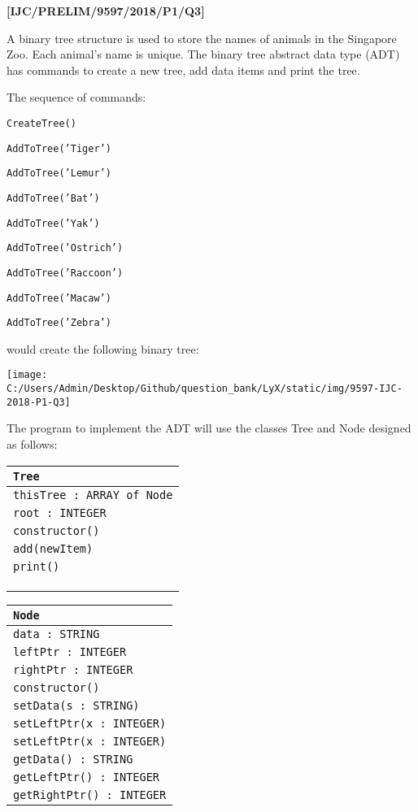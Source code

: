 \item \textbf{{[}IJC/PRELIM/9597/2018/P1/Q3{]} }

A binary tree structure is used to store the names of animals in the
Singapore Zoo. Each animal\textquoteright s name is unique. The binary
tree abstract data type (ADT) has commands to create a new tree, add
data items and print the tree.

The sequence of commands:

\noindent %
\noindent\begin{minipage}[t]{1\columnwidth}%
\texttt{CreateTree() }

\texttt{AddToTree('Tiger') }

\texttt{AddToTree('Lemur') }

\texttt{AddToTree('Bat') }

\texttt{AddToTree('Yak') }

\texttt{AddToTree('Ostrich') }

\texttt{AddToTree('Raccoon') }

\texttt{AddToTree('Macaw')}

\texttt{AddToTree('Zebra')}%
\end{minipage}

would create the following binary tree:
\begin{center}
\texttt{[image: C:/Users/Admin/Desktop/Github/question\_bank/LyX/static/img/9597-IJC-2018-P1-Q3]}
\par\end{center}

The program to implement the ADT will use the classes Tree and Node
designed as follows:
\begin{center}
\begin{tabular}{|l|}
\hline 
\texttt{\hspace{0.25\columnwidth}Tree}\tabularnewline
\hline 
\texttt{thisTree : ARRAY of Node}\tabularnewline
\texttt{root : INTEGER}\tabularnewline
\hline 
\texttt{constructor()}\tabularnewline
\texttt{add(newItem)}\tabularnewline
\texttt{print()}\tabularnewline
\tabularnewline
\tabularnewline
\tabularnewline
\hline 
\end{tabular}%
\begin{tabular}{|l|}
\hline 
\texttt{\hspace{0.25\columnwidth}Node}\tabularnewline
\hline 
\texttt{data : STRING}\tabularnewline
\texttt{leftPtr : INTEGER}\tabularnewline
\texttt{rightPtr : INTEGER }\tabularnewline
\hline 
\texttt{constructor()}\tabularnewline
\texttt{setData(s : STRING)}\tabularnewline
\texttt{setLeftPtr(x : INTEGER)}\tabularnewline
\texttt{setLeftPtr(x : INTEGER)}\tabularnewline
\texttt{getData() : STRING}\tabularnewline
\texttt{getLeftPtr() : INTEGER }\tabularnewline
\texttt{getRightPtr() : INTEGER}\tabularnewline
\hline 
\end{tabular}
\par\end{center}

